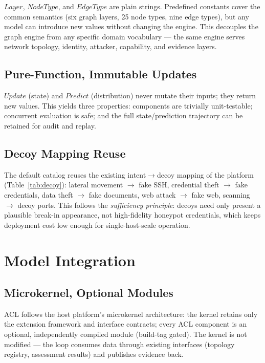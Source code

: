 \documentclass[11pt]{article}
\begin{document}
$\mathit{Layer}$, $\mathit{NodeType}$, and $\mathit{EdgeType}$ are plain
strings. Predefined constants cover the common semantics (six graph layers,
25 node types, nine edge types), but any model can introduce new values
without changing the engine. This decouples the graph engine from any
specific domain vocabulary --- the same engine serves network topology,
identity, attacker, capability, and evidence layers.

\subsection{Pure-Function, Immutable Updates}

$\mathit{Update}$ (state) and $\mathit{Predict}$ (distribution) never mutate
their inputs; they return new values. This yields three properties:
components are trivially unit-testable; concurrent evaluation is safe; and
the full state/prediction trajectory can be retained for audit and replay.

\subsection{Decoy Mapping Reuse}

The default catalog reuses the existing intent$\to$decoy mapping of the
platform (Table~\ref{tab:decoy}): lateral movement $\to$ fake SSH,
credential theft $\to$ fake credentials, data theft $\to$ fake documents,
web attack $\to$ fake web, scanning $\to$ decoy ports. This follows the
\textit{sufficiency principle}: decoys need only present a plausible
break-in appearance, not high-fidelity honeypot credentials, which keeps
deployment cost low enough for single-host-scale operation.

\section{Model Integration}
\label{sec:integration}

\subsection{Microkernel, Optional Modules}
\label{sec:microkernel}

ACL follows the host platform's microkernel architecture: the kernel retains
only the extension framework and interface contracts; every ACL component is
an optional, independently compiled module (build-tag gated). The kernel is
not modified --- the loop consumes data through existing interfaces
(topology registry, assessment results) and publishes evidence back.
\end{document}
